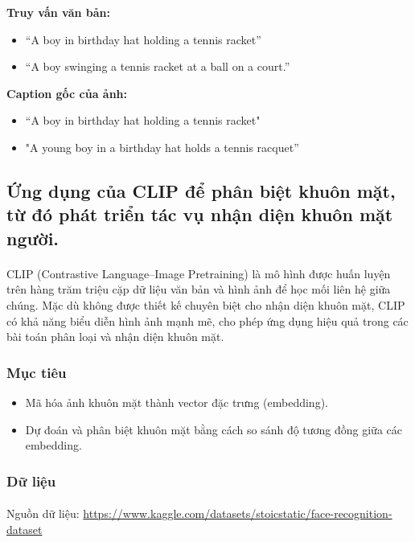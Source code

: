 {\textbf{Truy vấn văn bản:}
\begin{itemize}
    \item “A boy in birthday hat holding a tennis racket”
    \item “A boy swinging a tennis racket at a ball on a court.”
\end{itemize}

\textbf{Caption gốc của ảnh:}
\begin{itemize}
    \item “A boy in birthday hat holding a tennis racket"
    \item "A young boy in a birthday hat holds a tennis racquet”
\end{itemize}

\subsection{Ứng dụng của CLIP để phân biệt khuôn mặt, từ đó phát triển tác vụ nhận diện khuôn mặt người.}
\paragraph{}{CLIP (Contrastive Language–Image Pretraining) là mô hình được huấn luyện trên hàng trăm triệu cặp dữ liệu văn bản và hình ảnh để học mối liên hệ giữa chúng. Mặc dù không được thiết kế chuyên biệt cho nhận diện khuôn mặt, CLIP có khả năng biểu diễn hình ảnh mạnh mẽ, cho phép ứng dụng hiệu quả trong các bài toán phân loại và nhận diện khuôn mặt.}

\subsubsection{Mục tiêu}
\begin{itemize}
    \item Mã hóa ảnh khuôn mặt thành vector đặc trưng (embedding).
    \item Dự đoán và phân biệt khuôn mặt bằng cách so sánh độ tương đồng giữa các embedding.
\end{itemize}

\subsubsection{Dữ liệu}

\paragraph{}{Nguồn dữ liệu: \url{https://www.kaggle.com/datasets/stoicstatic/face-recognition-dataset}}
}
